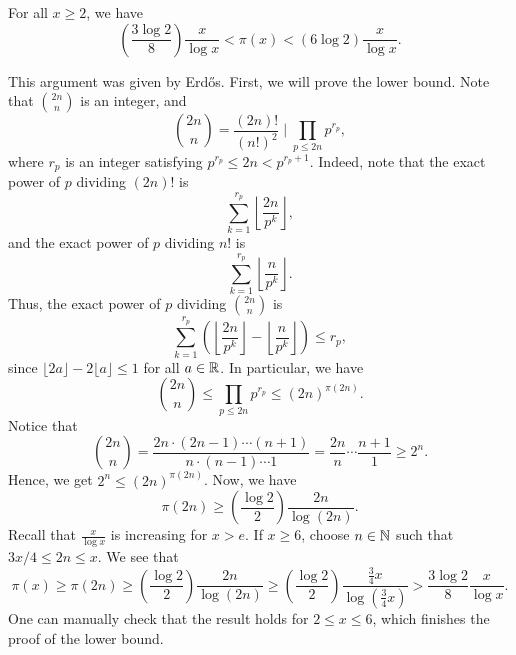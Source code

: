 \begin{thm}
For all $x \geq 2$, we have 
\[ \left( \frac{3\log 2}8 \right) \frac{x}{\log x} < \pi(x) < (6\log 2) \frac{x}{\log x}. \]
\end{thm}
\begin{pf}
This argument was given by Erd\H{o}s. First, we will prove the lower bound. Note that $\binom{2n}n$ is 
an integer, and 
\[ \binom{2n}n = \frac{(2n)!}{(n!)^2} \; \bigg\rvert \; \prod_{p\leq 2n} p^{r_p}, \]
where $r_p$ is an integer satisfying $p^{r_p} \leq 2n < p^{r_p+1}$. Indeed, note that 
the exact power of $p$ dividing $(2n)!$ is 
\[ \sum_{k=1}^{r_p} \left\lfloor \frac{2n}{p^k} \right\rfloor, \]
and the exact power of $p$ dividing $n!$ is 
\[ \sum_{k=1}^{r_p} \left\lfloor \frac{n}{p^k} \right\rfloor. \]
Thus, the exact power of $p$ dividing $\binom{2n}n$ is 
\[ \sum_{k=1}^{r_p} \left( \left\lfloor \frac{2n}{p^k} \right\rfloor -  \left\lfloor \frac{n}{p^k} \right\rfloor \right) \leq r_p, \] 
since $\lfloor 2a \rfloor - 2\lfloor a \rfloor \leq 1$ for all $a \in \mathbb{R}$. In particular, we have 
\[ \binom{2n}n \leq \prod_{p \leq 2n} p^{r_p} \leq (2n)^{\pi(2n)}. \]
Notice that 
\[ \binom{2n}n = \frac{2n \cdot (2n-1) \cdots (n+1)}{n \cdot (n-1) \cdots 1} = \frac{2n}n \cdots 
\frac{n+1}1 \geq 2^n. \]
Hence, we get $2^n \leq (2n)^{\pi(2n)}$. Now, we have 
\[ \pi(2n) \geq \left( \frac{\log 2}2 \right) \frac{2n}{\log(2n)}. \]
Recall that $\frac{x}{\log x}$ is increasing for $x > e$. If $x \geq 6$, choose $n \in \mathbb{N}$ such that 
$3x/4 \leq 2n \leq x$. We see that 
\[ \pi(x) \geq \pi(2n) \geq \left( \frac{\log 2}2 \right) \frac{2n}{\log(2n)} 
\geq \left( \frac{\log 2}2 \right) \frac{\frac34x}{\log(\frac34x)} > \frac{3\log 2}8 \frac{x}{\log x}. \]
One can manually check that the result holds for $2 \leq x \leq 6$, which finishes the proof of the lower 
bound. 


\end{pf}
